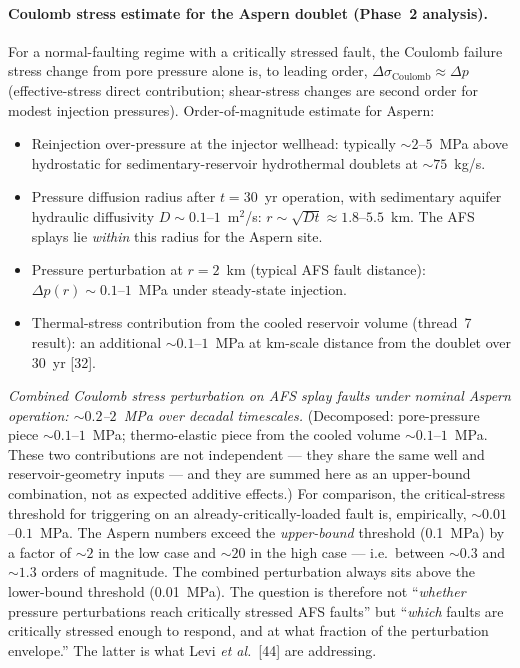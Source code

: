 \documentclass{article}
\begin{document}
\paragraph{Coulomb stress estimate for the Aspern doublet
(Phase~2 analysis).} For a normal-faulting regime with a critically
stressed fault, the Coulomb failure stress change from pore pressure
alone is, to leading order,
$\Delta\sigma_{\mathrm{Coulomb}} \approx \Delta p$ (effective-stress
direct contribution; shear-stress changes are second order for
modest injection pressures). Order-of-magnitude estimate for Aspern:
\begin{itemize}
\item Reinjection over-pressure at the injector wellhead: typically
$\sim 2$--$5$~MPa above hydrostatic for sedimentary-reservoir
hydrothermal doublets at $\sim 75$~kg/s.
\item Pressure diffusion radius after $t = 30$~yr operation, with
sedimentary aquifer hydraulic diffusivity $D \sim 0.1$--$1$~m$^2$/s:
$r \sim \sqrt{Dt} \approx 1.8$--$5.5$~km. The AFS splays lie
\emph{within} this radius for the Aspern site.
\item Pressure perturbation at $r = 2$~km (typical AFS fault distance):
$\Delta p(r) \sim 0.1$--$1$~MPa under steady-state injection.
\item Thermal-stress contribution from the cooled reservoir volume
(thread~7 result): an additional $\sim 0.1$--$1$~MPa at km-scale
distance from the doublet over 30~yr [32].
\end{itemize}
\emph{Combined Coulomb stress perturbation on AFS splay faults
under nominal Aspern operation: $\sim 0.2$--$2$~MPa over decadal
timescales.} (Decomposed: pore-pressure piece $\sim 0.1$--$1$~MPa;
thermo-elastic piece from the cooled volume $\sim 0.1$--$1$~MPa.
These two contributions are not independent --- they share the
same well and reservoir-geometry inputs --- and they are summed
here as an upper-bound combination, not as expected additive
effects.) For comparison, the critical-stress threshold for
triggering on an already-critically-loaded fault is, empirically,
$\sim 0.01$--$0.1$~MPa. The Aspern numbers exceed the
\emph{upper-bound} threshold (0.1~MPa) by a factor of $\sim 2$ in
the low case and $\sim 20$ in the high case --- i.e.\ between
$\sim 0.3$ and $\sim 1.3$ orders of magnitude. The combined
perturbation always sits above the lower-bound threshold
(0.01~MPa). The question is therefore not ``\emph{whether}
pressure perturbations reach critically stressed AFS faults'' but
``\emph{which} faults are critically stressed enough to respond,
and at what fraction of the perturbation envelope.'' The latter
is what Levi \emph{et al.}\ [44] are addressing.
\end{document}
